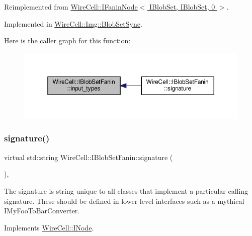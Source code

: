 Reimplemented from \hyperlink{class_wire_cell_1_1_i_fanin_node_a102c43a647e2e0070e329c397e27c2f5}{Wire\+Cell\+::\+I\+Fanin\+Node$<$ I\+Blob\+Set, I\+Blob\+Set, 0 $>$}.



Implemented in \hyperlink{class_wire_cell_1_1_img_1_1_blob_set_sync_aa32d9014596aec6bcbdcd8ed027a95ad}{Wire\+Cell\+::\+Img\+::\+Blob\+Set\+Sync}.

Here is the caller graph for this function\+:
\nopagebreak
\begin{figure}[H]
\begin{center}
\leavevmode
\includegraphics[width=350pt]{class_wire_cell_1_1_i_blob_set_fanin_a1783b57125c4b9df55a828ec832dbb72_icgraph}
\end{center}
\end{figure}
\mbox{\label{class_wire_cell_1_1_i_blob_set_fanin_a8649f2b27c10e56d730d47357caa36cc}} 
\subsubsection{\texorpdfstring{signature()}{signature()}}
{\footnotesize\ttfamily virtual std\+::string Wire\+Cell\+::\+I\+Blob\+Set\+Fanin\+::signature (\begin{DoxyParamCaption}{ }\end{DoxyParamCaption})\hspace{0.3cm}{\ttfamily [inline]}, {\ttfamily [virtual]}}

The signature is string unique to all classes that implement a particular calling signature. These should be defined in lower level interfaces such as a mythical I\+My\+Foo\+To\+Bar\+Converter. 

Implements \hyperlink{class_wire_cell_1_1_i_node_a0b0763465adf5ba7febe8e378162b584}{Wire\+Cell\+::\+I\+Node}.



